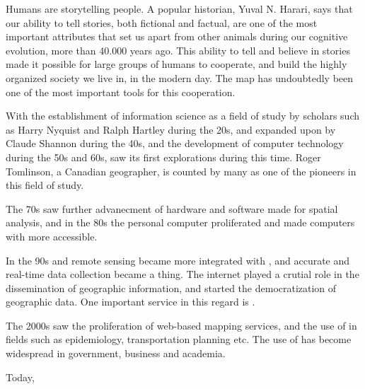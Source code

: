 Humans are storytelling people. A popular historian, Yuval N. Harari, says that
our ability to tell stories, both fictional and factual, are one of the most
important attributes that set us apart from other animals during our cognitive
evolution, more than  40.000 years ago. This ability to tell and
believe in stories made it possible for large groups of humans to cooperate, and
build the highly organized society we live in, in the modern day. The map has
undoubtedly been one of the most important tools for this cooperation.

With the establishment of information science as a field of study by scholars
such as Harry Nyquist and Ralph Hartley during the 20s, and expanded upon by
Claude Shannon during the 40s, and the development of computer technology during
the 50s and 60s,  saw its first explorations during this time.
Roger Tomlinson, a Canadian geographer, is counted by many as one of the
pioneers in this field of study.

The 70s saw further advanecment of hardware and software made for spatial
analysis, and in the 80s the personal computer proliferated and made
computers with  more accessible.

In the 90s  and remote sensing became more integrated with
, and accurate and real-time data collection became a thing.
The internet played a crutial role in the dissemination of geographic
information, and started the democratization of geographic data. One important
service in this regard is .

The 2000s saw the proliferation of web-based mapping services, and the use of
 in fields such as epidemiology, transportation planning etc.
The use of  has become widespread in government, business and
academia.

Today, 





